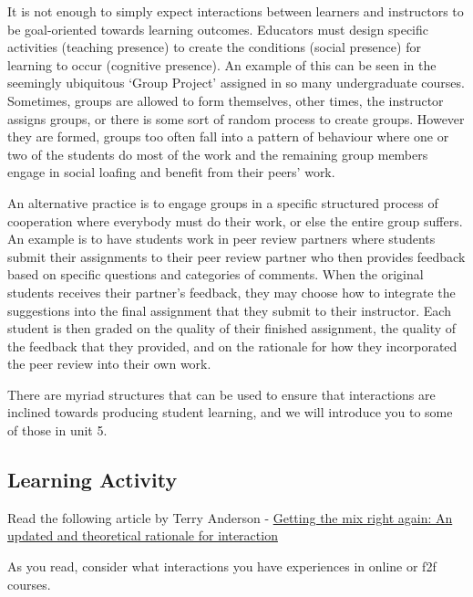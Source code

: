 \documentclass[
]{book}
\begin{document}
It is not enough to simply expect interactions between learners and instructors to be goal-oriented towards learning outcomes. Educators must design specific activities (teaching presence) to create the conditions (social presence) for learning to occur (cognitive presence). An example of this can be seen in the seemingly ubiquitous `Group Project' assigned in so many undergraduate courses. Sometimes, groups are allowed to form themselves, other times, the instructor assigns groups, or there is some sort of random process to create groups. However they are formed, groups too often fall into a pattern of behaviour where one or two of the students do most of the work and the remaining group members engage in social loafing and benefit from their peers' work.

An alternative practice is to engage groups in a specific structured process of cooperation where everybody must do their work, or else the entire group suffers. An example is to have students work in peer review partners where students submit their assignments to their peer review partner who then provides feedback based on specific questions and categories of comments. When the original students receives their partner's feedback, they may choose how to integrate the suggestions into the final assignment that they submit to their instructor. Each student is then graded on the quality of their finished assignment, the quality of the feedback that they provided, and on the rationale for how they incorporated the peer review into their own work.

There are myriad structures that can be used to ensure that interactions are inclined towards producing student learning, and we will introduce you to some of those in unit 5.

\hypertarget{learning-activity-1}{%
\subsection*{Learning Activity}\label{learning-activity-1}}

\begin{reflect}
Read the following article by Terry Anderson
- \href{http://www.irrodl.org/index.php/irrodl/article/view/149/230}{Getting the mix right again: An updated and theoretical rationale for interaction}

As you read, consider what interactions you have experiences in online or f2f courses.
\end{reflect}
\end{document}
